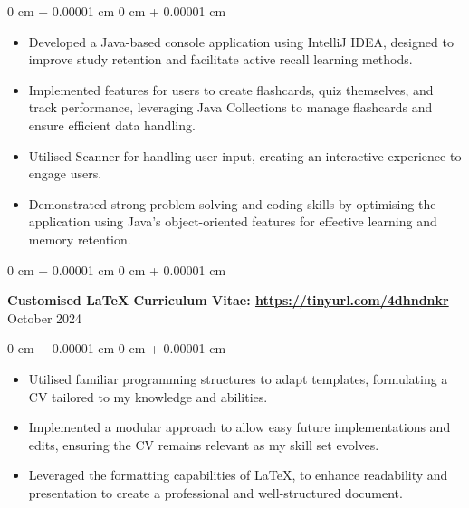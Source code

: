 \documentclass[10pt, letterpaper]{article}
\newenvironment{highlights}{
    \begin{itemize}[
        topsep=0.10 cm,
        parsep=0.10 cm,
        partopsep=0pt,
        itemsep=0pt,
        leftmargin=0 cm + 10pt
    ]
}{
    \end{itemize}
} %
\newenvironment{onecolentry}{
    \begin{adjustwidth}{
        0 cm + 0.00001 cm
    }{
        0 cm + 0.00001 cm
    }
}{
    \end{adjustwidth}
} %
\newenvironment{twocolentry}[2][]{
    \onecolentry
    \def\secondColumn{#2}
    \setcolumnwidth{\fill, 4.5 cm}
    \begin{paracol}{2}
}{
    \switchcolumn \raggedleft \secondColumn
    \end{paracol}
    \endonecolentry
} %
\begin{document}
        \vspace{0.05 cm}
        \begin{onecolentry}
            \begin{highlights}
                \item Developed a Java-based console application using IntelliJ IDEA, designed to improve study retention and facilitate active recall learning methods.
                \item Implemented features for users to create flashcards, quiz themselves, and track performance, leveraging Java Collections to manage flashcards and ensure efficient data handling.
                \item Utilised Scanner for handling user input, creating an interactive experience to engage users.
                \item Demonstrated strong problem-solving and coding skills by optimising the application using Java's object-oriented features for effective learning and memory retention.
            \end{highlights}
        \end{onecolentry}


        \vspace{0.2 cm}
    \begin{twocolentry}{ October 2024
        }
            \textbf{Customised LaTeX Curriculum Vitae: \href{https://github.com/rw200219/LaTeX-CV}{https://tinyurl.com/4dhndnkr}}\end{twocolentry}

        \vspace{0.05 cm}
        \begin{onecolentry}
            \begin{highlights}
                \item Utilised familiar programming structures to adapt templates, formulating a CV tailored to my knowledge and abilities.
            \item Implemented a modular approach to allow easy future implementations and edits, ensuring the CV remains relevant as my skill set evolves. 
                \item Leveraged the formatting capabilities of LaTeX, to enhance readability and presentation to create a professional and well-structured document.
            \end{highlights}
        \end{onecolentry}


        \vspace{0.2 cm}
       
\end{document}
